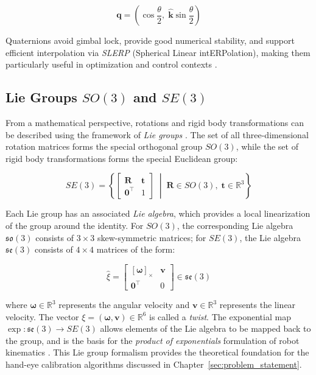 \begin{equation}
    \mathbf{q} = \left(\cos\frac{\theta}{2},\;
    \hat{\mathbf{k}}\sin\frac{\theta}{2}\right)
    \label{eq:quaternion}
\end{equation}

\noindent Quaternions avoid gimbal lock, provide good numerical stability, and
support efficient interpolation via \textit{SLERP} (Spherical Linear
intERPolation), making them particularly useful in optimization and control
contexts \cite{daniilidis1999hand}.

\subsection{Lie Groups \texorpdfstring{$SO(3)$}{SO(3)} and
\texorpdfstring{$SE(3)$}{SE(3)}}
\label{subsec:lie}

From a mathematical perspective, rotations and rigid body transformations can
be described using the framework of \textit{Lie groups}
\cite{murray1994mathematical}. The set of all three-dimensional rotation matrices
forms the special orthogonal group $SO(3)$, while the set of rigid body
transformations forms the special Euclidean group:

\begin{equation}
    SE(3) = \left\{
    \begin{bmatrix} \mathbf{R} & \mathbf{t} \\ \mathbf{0}^{\top} & 1
    \end{bmatrix}
    \;\middle|\; \mathbf{R} \in SO(3),\; \mathbf{t} \in \mathbb{R}^3
    \right\}
    \label{eq:SE3}
\end{equation}

\noindent Each Lie group has an associated \textit{Lie algebra}, which provides
a local linearization of the group around the identity. For $SO(3)$, the
corresponding Lie algebra $\mathfrak{so}(3)$ consists of $3\times3$
skew-symmetric matrices; for $SE(3)$, the Lie algebra $\mathfrak{se}(3)$
consists of $4\times4$ matrices of the form:

\begin{equation}
    \hat{\xi} =
    \begin{bmatrix} [\boldsymbol{\omega}]_{\times} & \mathbf{v} \\
    \mathbf{0}^{\top} & 0 \end{bmatrix}
    \in \mathfrak{se}(3)
    \label{eq:se3_algebra}
\end{equation}

\noindent where $\boldsymbol{\omega} \in \mathbb{R}^3$ represents the angular
velocity and $\mathbf{v} \in \mathbb{R}^3$ represents the linear velocity.
The vector $\xi = (\boldsymbol{\omega}, \mathbf{v}) \in \mathbb{R}^6$ is called
a \textit{twist}. \cite{murray1994mathematical}  The exponential map $\exp: \mathfrak{se}(3) \to SE(3)$ allows
elements of the Lie algebra to be mapped back to the group, and is the basis for
the \textit{product of exponentials} formulation of robot kinematics
\cite{murray1994mathematical}. This Lie group formalism provides the theoretical
foundation for the hand-eye calibration algorithms discussed in
Chapter~\ref{sec:problem_statement}.

